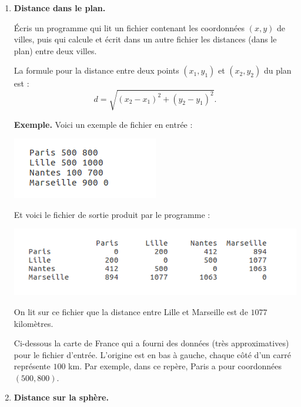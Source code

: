 \documentclass[11pt,class=report,crop=false]{standalone}
\begin{document}
\begin{activite}


\begin{enumerate}
  \item \textbf{Distance dans le plan.} 
  
  Écris un programme qui lit un fichier contenant les coordonnées $(x,y)$ de villes, puis qui calcule et écrit dans un autre fichier les distances (dans le plan) entre deux villes.
  
  La formule pour la distance entre deux points $(x_1,y_1)$ et $(x_2,y_2)$ du plan est :
  $$d = \sqrt{(x_2-x_1)^2 + (y_2-y_1)^2}.$$
  
  
\textbf{Exemple.} Voici un exemple de fichier en entrée :
\begin{center}
\includegraphics[scale=0.7]{ecran-fichiers-4a}
\end{center}   

Et voici le fichier de sortie produit par le programme :
\begin{center}
\includegraphics[scale=0.7]{ecran-fichiers-4b} 
\end{center}   
On lit sur ce fichier que la distance entre Lille et Marseille est de $1077$ kilomètres.


Ci-dessous la carte de France qui a fourni des données (très approximatives) pour le fichier d'entrée. L'origine est en bas à gauche, chaque côté d'un carré représente $100$ km. Par exemple, dans ce repère, Paris a pour coordonnées $(500,800)$.
 


  \item \textbf{Distance sur la sphère.} 
  

\end{enumerate}
\end{activite}
\end{document}
